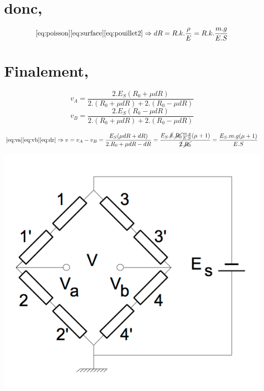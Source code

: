 \documentclass[10pt,a4paper]{report}
\begin{document}
\section*{donc,}
\begin{equation}
\label{eq:dr}
\eqref{eq:poisson} \eqref{eq:surface} \eqref{eq:pouillet2} \Rightarrow dR = R.k.\frac{\rho}{E} = R.k.\frac{m.g}{E.S}
\end{equation}
\section*{Finalement,}
\begin{equation}
\label{eq:va}
v_{A} = \dfrac{2.E_{S}(R_{0}+\mu dR)}{2.(R_{0}+\mu dR)+2.(R_{0}-\mu dR)}
\end{equation}
\begin{equation}
\label{eq:vb}
v_{B} = \dfrac{2.E_{S}(R_{0}-\mu dR)}{2.(R_{0}+\mu dR)+2.(R_{0}-\mu dR)}
\end{equation}

\begin{equation}
\eqref{eq:va} \eqref{eq:vb} \eqref{eq:dr} \Rightarrow v = v_{A} - v_{B} = \dfrac{E_{S}(\mu dR+dR)}{2.R_{0}+\mu dR -dR} = \dfrac{E_{S}.\cancel{k}.\cancel{R_{0}}\frac{m.g}{E.S}(\mu+1)}{\cancel{2}.\cancel{R_{0}}} = \frac{E_{S}.m.g (\mu + 1)}{E.S}
\end{equation}
\begin{center}
\includegraphics[scale=0.5]{wheatstone.png}
\end{center}
\end{document}
